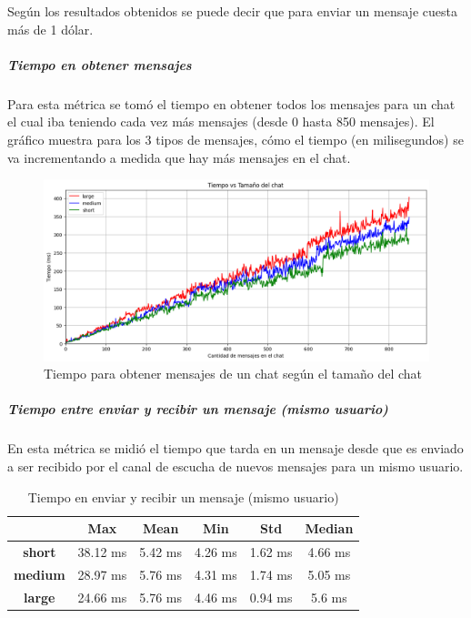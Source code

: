 Según los resultados obtenidos se puede decir que para enviar un mensaje cuesta más de 1 dólar.

\subparagraph{Tiempo en obtener mensajes}

Para esta métrica se tomó el tiempo en obtener todos los mensajes para un chat el cual iba teniendo cada vez más mensajes (desde 0 hasta 850 mensajes). El gráfico muestra para los 3 tipos de mensajes, cómo el tiempo (en milisegundos) se va incrementando a medida que hay más mensajes en el chat.

\begin{figure}[h!]
    \centering
    \includegraphics[width=1\linewidth]{img/blockchain-get-message-graphic.png}
    \caption{Tiempo para obtener mensajes de un chat según el tamaño del chat}
    \label{fig:blockchain-get-message-graphic.png}
\end{figure}

\subparagraph{Tiempo entre enviar y recibir un mensaje (mismo usuario)}

En esta métrica se midió el tiempo que tarda en un mensaje desde que es enviado a ser recibido por el canal de escucha de nuevos mensajes para un mismo usuario.

\setlength\tabcolsep{10pt}
\begin{table}[H]
    \centering
    \begin{tabular}{|c|c|c|c|c|c|}
    \hline
    & \textbf{Max} & \textbf{Mean} & \textbf{Min} & \textbf{Std} & \textbf{Median} \\
    \hline
    \textbf{short} & 38.12 ms & 5.42 ms & 4.26 ms & 1.62 ms & 4.66 ms \\
    \hline
    \textbf{medium} & 28.97 ms & 5.76 ms & 4.31 ms & 1.74 ms & 5.05 ms \\
    \hline
    \textbf{large} & 24.66 ms & 5.76 ms & 4.46 ms & 0.94 ms & 5.6 ms \\
    \hline
    \end{tabular}
    \caption{Tiempo en enviar y recibir un mensaje (mismo usuario)}
    \label{tab:tiempo-send-recv-same-user}
\end{table}

